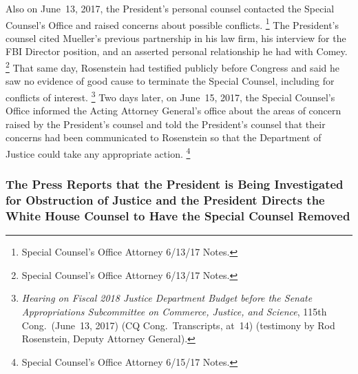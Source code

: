 Also on June~13, 2017, the President's personal counsel contacted the Special Counsel's Office and raised concerns about possible conflicts.%
\footnote{Special Counsel's Office Attorney 6/13/17 Notes.}
The President's counsel cited Mueller's previous partnership in his law firm, his interview for the FBI Director position, and an asserted personal relationship he had with Comey.%
\footnote{Special Counsel's Office Attorney 6/13/17 Notes.}
That same day, Rosenstein had testified publicly before Congress and said he saw no evidence of good cause to terminate the Special Counsel, including for conflicts of interest.%
\footnote{\textit{Hearing on Fiscal 2018 Justice Department Budget before the Senate Appropriations Subcommittee on Commerce, Justice, and Science}, 115th Cong.\ (June~13, 2017) (CQ Cong.\ Transcripts, at~14) (testimony by Rod Rosenstein, Deputy Attorney General).}
Two days later, on June~15, 2017, the Special Counsel's Office informed the Acting Attorney General's office about the areas of concern raised by the President's counsel and told the President's counsel that their concerns had been communicated to Rosenstein so that the Department of Justice could take any appropriate action.%
\footnote{Special Counsel's Office Attorney 6/15/17 Notes.}

\subsubsection{The Press Reports that the President is Being Investigated for Obstruction of Justice and the President Directs the White House Counsel to Have the Special Counsel Removed}

